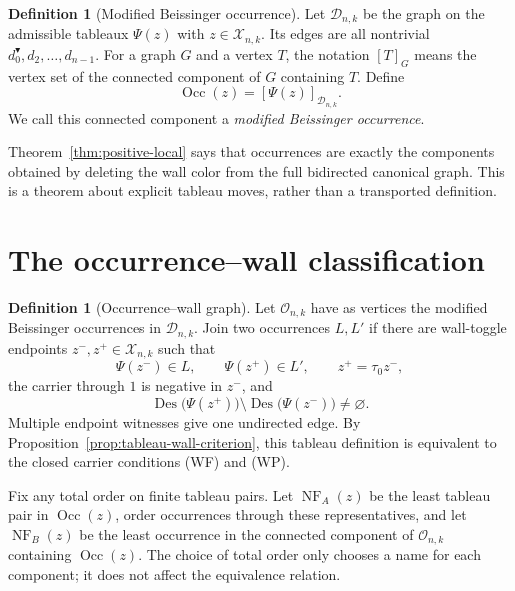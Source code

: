 \documentclass[11pt]{article}
\theoremstyle{definition}
\newtheorem{definition}[theorem]{Definition}
\theoremstyle{remark}
\newcommand{\Des}{\operatorname{Des}}
\newcommand{\Occ}{\operatorname{Occ}}
\newcommand{\NF}{\operatorname{NF}}
\newcommand{\cD}{\mathcal D}
\newcommand{\cO}{\mathcal O}
\newcommand{\cX}{\mathcal X}
\begin{document}
\begin{definition}[Modified Beissinger occurrence]
\label{def:occurrence}
Let $\cD_{n,k}$ be the graph on the admissible tableaux $\Psi(z)$ with
$z\in\cX_{n,k}$.  Its edges are all nontrivial
$d_0^{\blacktriangledown},d_2,\ldots,d_{n-1}$.  For a graph $G$ and a
vertex $T$, the notation $[T]_G$ means the vertex set of the connected
component of $G$ containing $T$.  Define
\[
                         \Occ(z)=[\Psi(z)]_{\cD_{n,k}}.
\]
We call this connected component a \emph{modified Beissinger occurrence}.
\end{definition}

Theorem~\ref{thm:positive-local} says that occurrences are exactly the
components obtained by deleting the wall color from the full bidirected
canonical graph.  This is a theorem about explicit tableau moves, rather
than a transported definition.

\section{The occurrence--wall classification}
\label{sec:classification}

\begin{definition}[Occurrence--wall graph]
\label{def:wall-graph}
Let $\cO_{n,k}$ have as vertices the modified Beissinger occurrences in
$\cD_{n,k}$.  Join two occurrences $L,L'$ if there are wall-toggle
endpoints $z^-,z^+\in\cX_{n,k}$ such that
\[
 \Psi(z^-)\in L,\qquad \Psi(z^+)\in L',\qquad
 z^+=\tau_0z^-,
\]
the carrier through $1$ is negative in $z^-$, and
\begin{equation}
 \Des\bigl(\Psi(z^+)\bigr)
       \setminus\Des\bigl(\Psi(z^-)\bigr)\ne\varnothing.
 \label{eq:wall-graph-tableau-edge}
\end{equation}
Multiple endpoint witnesses give one undirected edge.  By
Proposition~\ref{prop:tableau-wall-criterion}, this tableau definition is
equivalent to the closed carrier conditions \textup{(WF)} and \textup{(WP)}.
\end{definition}

Fix any total order on finite tableau pairs.  Let $\NF_A(z)$ be the least
tableau pair in $\Occ(z)$, order occurrences through these representatives,
and let $\NF_B(z)$ be the least occurrence in the connected component of
$\cO_{n,k}$ containing $\Occ(z)$.  The choice of total order only chooses
a name for each component; it does not affect the equivalence relation.
\end{document}
